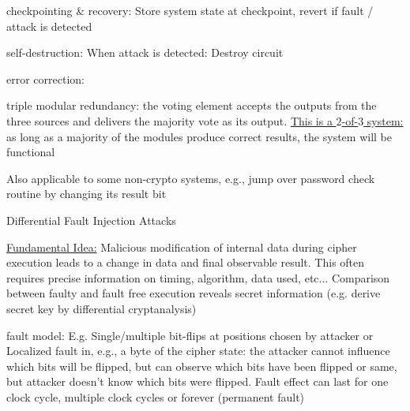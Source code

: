 \documentclass[landscape, a4paper]{article}
\begin{document}
\begin{minipage}[t]{0.2\linewidth}
\begin{betterlist}
\begin{betterlist}
\begin{betterlist}
\begin{betterlist}
					\item \alert{checkpointing \& recovery:} Store system state at checkpoint, revert if fault / attack is detected

					\item \alert{self-destruction:} When attack is detected: Destroy circuit
				\end{betterlist}

			\end{betterlist}
			\item \alert{error correction:}
			\begin{betterlist}
				\item \alert{triple modular redundancy:} the voting element accepts the outputs from the three sources and delivers the \alert{majority vote as its output}. \underline{This is a $2$-of-$3$ system:} as long as a majority of the modules produce correct results, the system will be functional
			\end{betterlist}
		\end{betterlist}
	\end{betterlist}
	\begin{betterlist}
		\item Also applicable to some non-crypto systems, e.g., jump over password check routine by changing its result bit
		\item \alert{Differential Fault Injection Attacks}
		\begin{betterlist}
			\item \underline{Fundamental Idea:} Malicious modification of internal data during cipher execution leads to a change in data and final observable result. This often requires precise information on timing, algorithm, data used, etc... Comparison between faulty and fault free execution reveals secret information (e.g. derive secret key by differential cryptanalysis)
			\item \alert{fault model:} E.g. Single/multiple bit-flips at positions chosen by attacker or Localized fault in, e.g., a byte of the cipher state: the attacker cannot influence which bits will be flipped, but can observe which bits have been flipped or same, but attacker doesn’t know which bits were flipped. Fault effect can last for one clock cycle, multiple clock cycles or forever (permanent fault)

\end{betterlist}
\end{betterlist}
\end{minipage}
\end{document}
